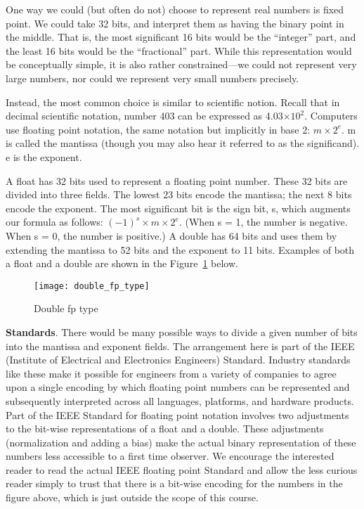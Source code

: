 \documentclass[11pt, a4paper]{article}
\begin{document}
One way we could (but often do not) choose to represent real numbers is fixed point. We could take 32 bits, and interpret them as having the binary point in the middle. That is, the most significant 16 bits would be the “integer” part, and the least 16 bits would be the “fractional” part. While this representation would be conceptually simple, it is also rather constrained—we could not represent very large numbers, nor could we represent very small numbers precisely.

Instead, the most common choice is similar to scientific notion. Recall that in decimal scientific notation, number 403 can be expressed as 4.03$\times 10^{2}$. Computers use floating point notation, the same notation but implicitly in base 2: $m\times 2^{e}$. m is called the mantissa (though you may also hear it referred to as the significand). e is the exponent.

A float has 32 bits used to represent a floating point number. These 32 bits are divided into three fields. The lowest 23 bits encode the mantissa; the next 8 bits encode the exponent. The most significant bit is the sign bit, s, which augments our formula as follows: $(-1)^{s}\times m\times 2^{e}$. (When s = 1, the number is negative. When s = 0, the number is positive.) A double has 64 bits and uses them by extending the mantissa to 52 bits and the exponent to 11 bits. Examples of both a float and a double are shown in the Figure~\ref{fig:double_fp_type} below.


\begin{figure}[htpb]
  \centering
  \texttt{[image: double\_fp\_type]}
  \caption{Double fp type}
  \label{fig:double_fp_type}
\end{figure}



\textbf{Standards}. There would be many possible ways to divide a given number of bits into the mantissa and exponent fields. The arrangement here is part of the IEEE (Institute of Electrical and Electronics Engineers) Standard. Industry standards like these make it possible for engineers from a variety of companies to agree upon a single encoding by which floating point numbers can be represented and subsequently interpreted across all languages, platforms, and hardware products. Part of the IEEE Standard for floating point notation involves two adjustments to the bit-wise representations of a float and a double. These adjustments (normalization and adding a bias) make the actual binary representation of these numbers less accessible to a first time observer. We encourage the interested reader to read the actual IEEE floating point Standard and allow the less curious reader simply to trust that there is a bit-wise encoding for the numbers in the figure above, which is just outside the scope of this course.
\end{document}

